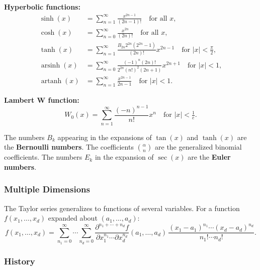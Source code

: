 \medskip

\textbf{Hyperbolic functions:}
\begin{align}
\sinh(x) &= \sum_{n=1}^{\infty} \frac{x^{2n-1}}{(2n-1)!}
\quad \text{for all } x, \\[4pt]
\cosh(x) &= \sum_{n=0}^{\infty} \frac{x^{2n}}{(2n)!}
\quad \text{for all } x, \\[4pt]
\tanh(x) &= \sum_{n=1}^{\infty}
\frac{B_{2n} 2^{2n}(2^{2n}-1)}{(2n)!} x^{2n-1}
\quad \text{for } |x| < \tfrac{\pi}{2}, \\[4pt]
\operatorname{arsinh}(x) &= \sum_{n=0}^{\infty}
\frac{(-1)^n (2n)!}{2^{2n}(n!)^2 (2n+1)} x^{2n+1}
\quad \text{for } |x| < 1, \\[4pt]
\operatorname{artanh}(x) &= \sum_{n=1}^{\infty}
\frac{x^{2n-1}}{2n-1}
\quad \text{for } |x| < 1.
\end{align}

\medskip

\textbf{Lambert W function:}
\[
W_0(x) = \sum_{n=1}^{\infty}
\frac{(-n)^{n-1}}{n!} x^n
\quad \text{for } |x| < \tfrac{1}{e}.
\]

\medskip

The numbers $B_k$ appearing in the expansions of $\tan(x)$ and $\tanh(x)$ are the \textbf{Bernoulli numbers}.  
The coefficients $\binom{\alpha}{n}$ are the generalized binomial coefficients.  
The numbers $E_k$ in the expansion of $\sec(x)$ are the \textbf{Euler numbers}.

\subsubsection{Multiple Dimensions}
\label{sss:mult-7324}

The Taylor series generalizes to functions of several variables. For a function
$f(x_1,\dots,x_d)$ expanded about $(a_1,\dots,a_d)$:
\[
f(x_1,\dots,x_d)
=
\sum_{n_1=0}^{\infty} \cdots \sum_{n_d=0}^{\infty}
\frac{\partial^{n_1+\cdots+n_d} f}{\partial x_1^{n_1}\cdots \partial x_d^{n_d}}(a_1,\dots,a_d)
\,
\frac{(x_1-a_1)^{n_1}\cdots (x_d-a_d)^{n_d}}{n_1!\cdots n_d!}.
\]

\subsubsection{History}
\label{sss:hist-3cd1}

